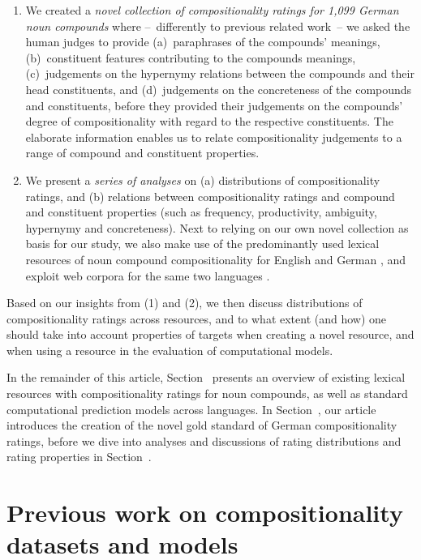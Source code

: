 \documentclass[output=paper,colorlinks,citecolor=brown]{langscibook}
\begin{document}
\begin{enumerate}[label=(\arabic*)]

\item We created a \emph{novel collection of compositionality ratings for 1,099 German noun compounds} where --~differently to previous related work~-- we asked the human judges to provide (a)~paraphrases of the compounds' meanings, (b)~constituent features contributing to the compounds meanings, (c)~judgements on the hypernymy relations between the compounds and their head constituents, and (d)~judgements on the concreteness of the compounds and constituents, before they provided their judgements on the compounds' degree of compositionality with regard to the respective constituents. The elaborate information enables us to relate compositionality judgements to a range of compound and constituent properties. 

\item We present a \emph{series of analyses} on (a) distributions of compositionality ratings, and (b) relations between compositionality ratings and compound and constituent properties (such as frequency, productivity, ambiguity, hypernymy and concreteness). Next to relying on our own novel collection as basis for our study, we also make use of the predominantly used lexical resources of noun compound compositionality for English \citep{ReddyEtAl:11a, CordeiroEtAl:19} and German \citep{SchulteImWaldeEtAl:13,SchulteImWaldeEtAl:16a}, and exploit web corpora for the same two languages \citep{BaroniEtAl:09,Schaefer/Bildhauer:12}.

\end{enumerate}
%
Based on our insights from (1) and (2), we then discuss distributions of compositionality ratings across resources, and to what extent (and how) one should take into account properties of targets when creating a novel resource, and when using a resource in the evaluation of computational models.

In the remainder of this article, Section~ presents an overview of existing lexical resources with compositionality ratings for noun compounds, as well as standard computational prediction models across languages. In Section~, our article introduces the creation of the novel gold standard of German compositionality ratings, before we dive into analyses and discussions of rating distributions and rating properties in Section~.


\section{Previous work on compositionality datasets and models}
\label{sec:overview}
\end{document}
